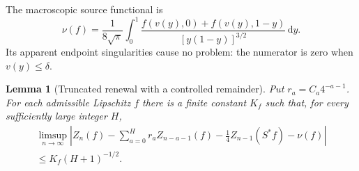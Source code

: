 \documentclass[11pt,a4paper]{article}
\newtheorem{lemma}[lemma]{Lemma}
\theoremstyle{definition}\newaliascnt{definition}{theorem}
\theoremstyle{remark}\newaliascnt{remark}{theorem}
\newcommand{\dd}{\mathrm d}
\begin{document}
The macroscopic source functional is
\begin{equation}
 \nu(f)=\frac1{8\sqrt\pi}\int_0^1
 \frac{f(v(y),0)+f(v(y),1-y)}{[y(1-y)]^{3/2}}\,\dd y.
 \label{mj:eq:nu}
\end{equation}
Its apparent endpoint singularities cause no problem: the numerator is zero
when $v(y)\le\delta$.

\begin{lemma}[Truncated renewal with a controlled remainder]
\label{mj:lem:renewal}
Put $r_a=C_a4^{-a-1}$. For each admissible Lipschitz $f$ there is a finite
constant $K_f$ such that, for every sufficiently large integer $H$,
\begin{multline}
 \limsup_{n\to\infty}\left|
 Z_n(f)-\sum_{a=0}^H r_aZ_{n-a-1}(f)
       -\frac14 Z_{n-1}(S^\ast f)-\nu(f)\right|\\
 \le K_f(H+1)^{-1/2}.
 \label{mj:eq:renewal-approx}
\end{multline}
\end{lemma}
\end{document}
